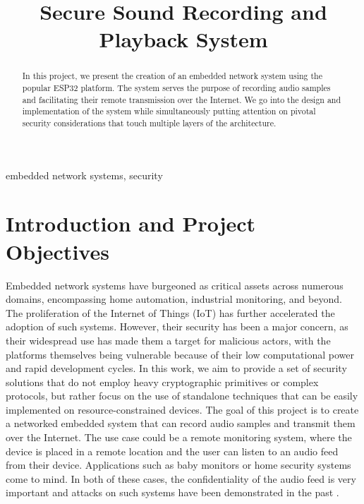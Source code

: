 \documentclass[conference]{IEEEtran}
\begin{document}
\title{Secure Sound Recording and Playback System}

\author{
\and
{}
}

\maketitle

\begin{abstract}
    In this project, we present the creation of an
    embedded network system using the popular ESP32 platform. The system serves
    the purpose of recording audio samples and facilitating their remote
    transmission over the Internet. We go into the design and implementation
    of the system while simultaneously putting attention
    on pivotal security considerations that touch multiple
    layers of the architecture. 
\end{abstract}

\begin{IEEEkeywords}
embedded network systems, security
\end{IEEEkeywords}

\section{Introduction and Project Objectives}

Embedded network systems have burgeoned as critical assets across numerous
domains, encompassing home automation, industrial monitoring, and beyond. 
The proliferation of the Internet of Things (IoT) has further accelerated the
adoption of such systems\cite{IotTechEmbedded}.
However, their security has been a major concern,\cite{EmbeddedSecSurveyEU}
as their widespread use has made them a target for malicious actors, 
with the platforms themselves being vulnerable because of their low computational power and
rapid development cycles\cite{EmbeddedSecChallenges}.
In this work, we aim to provide a set of security solutions that do not employ 
heavy cryptographic primitives or complex protocols, but rather
focus on the use of standalone techniques that can be easily implemented
on resource-constrained devices.
The goal of this project is to create a networked embedded system that can record audio samples and transmit them over the Internet.
The use case could be a remote monitoring system, where the device is placed in a remote location and 
the user can listen to an audio feed from their device. Applications such as baby monitors or home security systems come to mind.
In both of these cases, the confidentiality of the audio feed is very important and
attacks on such systems have been demonstrated in the past \cite{BabyMonitorHack, VideoSurvAttacks}.
\end{document}
